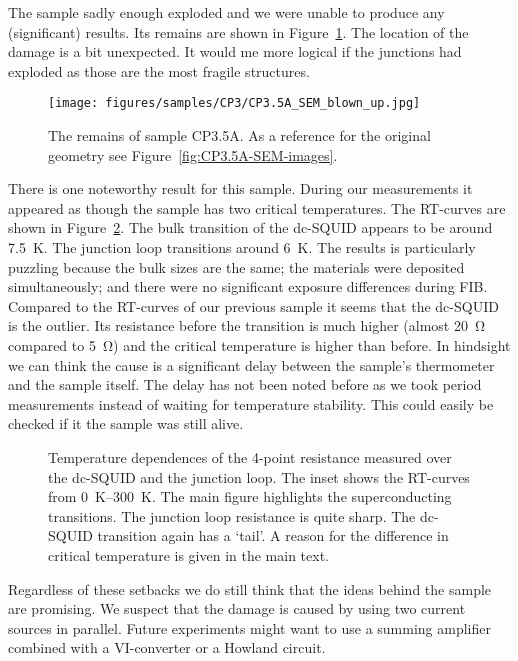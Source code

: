 The sample sadly enough exploded and we were unable to produce any (significant) results. Its remains are shown in Figure~\ref{fig:CP3.5A-remains}. The location of the damage is a bit unexpected. It would me more logical if the junctions had exploded as those are the most fragile structures.

\begin{figure}[ht!]	
	\centering
	\texttt{[image: figures/samples/CP3/CP3.5A\_SEM\_blown\_up.jpg]}
	\caption{The remains of sample CP3.5A. As a reference for the original geometry see Figure~\ref{fig:CP3.5A-SEM-images}.}
	\label{fig:CP3.5A-remains}
\end{figure}

There is one noteworthy result for this sample. During our measurements it appeared as though the sample has two critical temperatures. The RT-curves are shown in Figure~\ref{fig:CP3.5A_RT_curves}. The bulk transition of the dc-SQUID appears to be around \qty{7.5}{\kelvin}. The junction loop transitions around \qty{6}{\kelvin}. The results is particularly puzzling because the bulk sizes are the same; the materials were deposited simultaneously; and there were no significant exposure differences during FIB. Compared to the RT-curves of our previous sample it seems that the dc-SQUID is the outlier. Its resistance before the transition is much higher (almost \qty{20}{\ohm} compared to \qty{5}{\ohm}) and the critical temperature is higher than before. In hindsight we can think the cause is a significant delay between the sample's thermometer and the sample itself. The delay has not been noted before as we took period measurements instead of waiting for temperature stability. This could easily be checked if it the sample was still alive.

\begin{figure}[ht!]
	\centering
	
	\caption{Temperature dependences of the 4-point resistance measured over the dc-SQUID and the junction loop. The inset shows the RT-curves from \qtyrange{0}{300}{\kelvin}. The main figure highlights the superconducting transitions. The junction loop resistance is quite sharp. The dc-SQUID transition again has a `tail'. A reason for the difference in critical temperature is given in the main text.}
	\label{fig:CP3.5A_RT_curves}
\end{figure}

Regardless of these setbacks we do still think that the ideas behind the sample are promising. We suspect that the damage is caused by using two current sources in parallel. Future experiments might want to use a summing amplifier combined with a VI-converter or a Howland circuit.